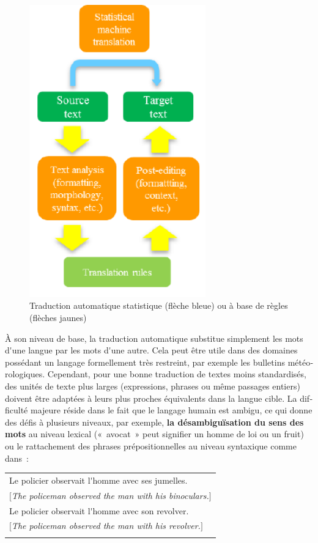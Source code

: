 \documentclass[]{../metanetpaper}
\begin{document}
\begin{french}
\begin{multicols}{2}
\begin{figure}[!ht]
\begin{center}
 \includegraphics[width=3.0in]{../_media/french/machine_translation}
\caption{Traduction automatique statistique (flèche bleue) ou à base de règles (flèches jaunes)}
\label{fig:mtarchi}
\end{center}
\end{figure}

À son niveau de base, la traduction automatique substitue simplement les mots d{\mbox '}une langue
par les mots d{\mbox '}une autre. Cela peut être utile dans des domaines
possédant un langage formellement très restreint, par exemple les
bulletins météorologiques. Cependant, pour une bonne traduction de
textes moins standardisés, des unités de texte plus larges
(expressions, phrases ou même passages entiers) doivent être adaptées à
leurs plus proches équivalents dans la langue cible. La difficulté
majeure réside dans le fait que le langage humain est ambigu, ce qui
donne des défis à plusieurs niveaux, par exemple, {\bf la
  désambiguïsation du sens des mots} au niveau lexical («~avocat~»
peut signifier un homme de loi ou un fruit) ou le rattachement des phrases prépositionnelles au niveau syntaxique comme dans~:

\begin{tabular}{l}
\\
Le policier observait l{\mbox '}homme avec ses jumelles.\\
$[${\it The policeman observed the man with his binoculars.}$]$\\
Le policier observait l{\mbox '}homme avec son revolver.\\
$[${\it The policeman observed the man with his revolver.}$]$\\
\\
\end{tabular}


\end{multicols}
\end{french}
\end{document}
